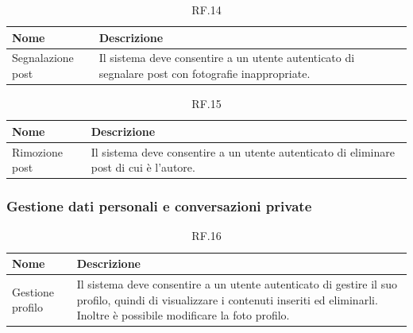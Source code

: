 \documentclass{natourDoc}
\begin{document}
\begin{table}[H]
	\centering
	\begin{tabular}{ |p{5cm}|p{10.3cm}| }
		\hline
		\rowcolor{PineGreen!70}
		\textbf{Nome}     & \textbf{Descrizione}                                                                \\
		\hline
		Segnalazione post & Il sistema deve consentire a un utente autenticato di segnalare post con fotografie
		inappropriate.                                                                                          \\
		\hline
	\end{tabular}
	\caption{RF.14}

\end{table}

\begin{table}[H]
	\centering
	\begin{tabular}{ |p{5cm}|p{10.3cm}| }
		\hline
		\rowcolor{PineGreen!70}
		\textbf{Nome}  & \textbf{Descrizione}                                                        \\
		\hline
		Rimozione post & Il sistema deve consentire a un utente autenticato di eliminare post di cui
		è l'autore.                                                                                  \\
		\hline
	\end{tabular}
	\caption{RF.15}

\end{table}

\subsubsection{Gestione dati personali e conversazioni private}
\begin{table}[H]
	\centering
	\begin{tabular}{ |p{5cm}|p{10.3cm}| }
		\hline
		\rowcolor{PineGreen!70}
		\textbf{Nome}    & \textbf{Descrizione}                                                          \\
		\hline
		Gestione profilo & Il sistema deve consentire a un utente autenticato di gestire il suo profilo, 
		quindi di visualizzare i contenuti inseriti ed eliminarli. Inoltre è possibile modificare la foto profilo.  \\
		\hline
	\end{tabular}
	\caption{RF.16}

\end{table}
\end{document}
